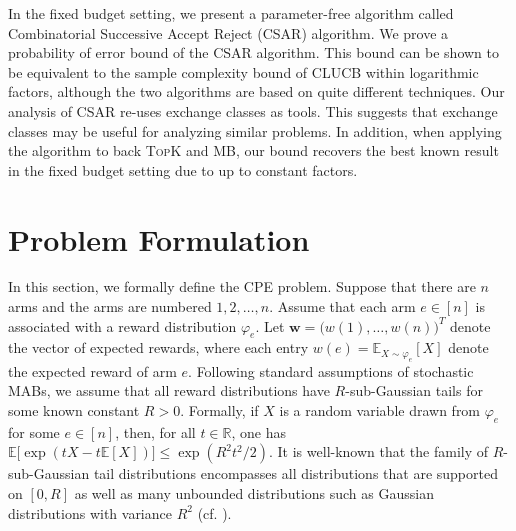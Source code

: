 \documentclass{article}
\newcommand{\wei}[1]{}
\newcommand{\wei}[1]{{\color{blue!50!black}  [\text{Wei:} #1]}}
\newcommand{\junk}[1]{}
\newcommand{\Algorithm}{{\small \textsf{CLUCB}}\xspace}
\newcommand{\AlgorithmBud}{{\small \textsf{CSAR}}\xspace}
\newcommand{\Problem}{{CPE}\xspace}
\newcommand{\Rew}{\varphi}
\newcommand{\E}{\mathbb E}
\newcommand{\RR}{\mathbb R}
\newcommand{\MultiIdent}{\textsc{TopK}\xspace}
\newcommand{\MultiBandit}{\textsc{MB}\xspace}
\renewcommand{\vec}[1]{\boldsymbol{#1}}
\begin{document}
In the fixed budget setting, we present a parameter-free algorithm called Combinatorial Successive Accept Reject (\AlgorithmBud) algorithm.
We prove a probability of error bound of the \AlgorithmBud algorithm. 
This bound can be shown to be equivalent to the sample complexity bound of \Algorithm within logarithmic factors, although the two algorithms are based on quite different techniques. 
Our analysis of \AlgorithmBud re-uses exchange classes as tools. 
This suggests that exchange classes may be useful for analyzing  similar problems. 
In addition, when applying the algorithm to back \MultiIdent and \MultiBandit, our bound recovers the best known result in the fixed budget setting due to \citet{bubeck2013multiple} up to constant factors. 

\junk{
\textbf{Useful notations.} Let $[n]$ denote the set $\{1,\ldots,n\}$. Suppose that $\vec w\in \RR^{n}$ is a vector and $E\subseteq[n]$ is a set. 
Let $w(i)$ denote the $i$-th entry of $\vec w$. 
We define $w(E) \triangleq  \sum_{i\in E} w(i)$ to be the sum of entries indexed by $E$.
}
\vspace{-0.7em}
\section{Problem Formulation}
\vspace{-0.7em}
In this section,  we formally define the \Problem problem.
Suppose that there are $n$ arms and the arms are numbered $1,2,\ldots,n$.
Assume that each arm $e\in[n]$ is associated with a reward distribution $\Rew_e$.
Let $\vec w = \big(w(1),\ldots, w(n)\big)^T$ denote the vector of expected rewards, where each entry $w(e)=\E_{X\sim \Rew_e}[X]$ denote the expected reward of arm $e$.
Following standard assumptions of stochastic MABs, we assume that all reward distributions have $R$-sub-Gaussian tails for some known constant $R>0$. 
Formally, if $X$ is a random variable drawn from $\Rew_e$ for some $e\in[n]$, then, for all $t\in \RR$, one has $\mathbb E\big[\exp(tX-t\mathbb E[X])\big] \le \exp(R^2t^2/2)$.
It is well-known that the family of $R$-sub-Gaussian tail distributions encompasses all distributions that are supported on $[0,R]$ as well as many unbounded distributions such as Gaussian distributions with variance $R^2$ (cf. \citep{pollard2000asymptopia}).
\end{document}
